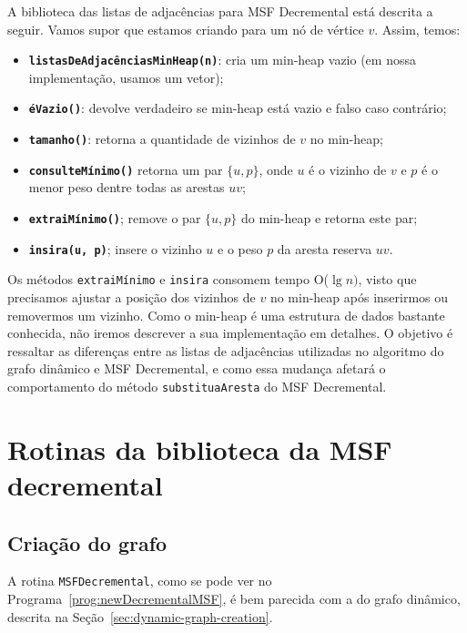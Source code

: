 A biblioteca das listas de adjacências para MSF Decremental está descrita a seguir. Vamos supor que estamos criando para um nó de vértice $v$. Assim, temos:

\begin{itemize}
    \item \texttt{\textbf{listasDeAdjacênciasMinHeap(n)}}: cria um min-heap vazio (em nossa implementação, usamos um vetor);
    \item \texttt{\textbf{éVazio()}}: devolve verdadeiro se min-heap está vazio e falso caso contrário;
    \item \texttt{\textbf{tamanho()}}: retorna a quantidade de vizinhos de $v$ no min-heap;
    \item \texttt{\textbf{consulteMínimo()}} retorna um par $\{u, p\}$, onde $u$ é o vizinho de $v$ e $p$ é o menor peso dentre todas as arestas $uv$;
    \item \texttt{\textbf{extraiMínimo()}}; remove o par $\{u, p\}$ do min-heap e retorna este par;
    \item \texttt{\textbf{insira(u, p)}}; insere o vizinho $u$ e o peso $p$ da aresta reserva $uv$.

\end{itemize} 

Os métodos \texttt{extraiMínimo} e \texttt{insira} consomem tempo O($\lg n)$, visto que precisamos ajustar a posição dos vizinhos de $v$ no min-heap após inserirmos ou removermos um vizinho. Como o min-heap é uma estrutura de dados bastante conhecida, não iremos descrever a sua implementação em detalhes. O objetivo é ressaltar as diferenças entre as listas de adjacências utilizadas no algoritmo do grafo dinâmico e MSF Decremental, e como essa mudança afetará o comportamento do método \texttt{substituaAresta} do MSF Decremental.

\section{Rotinas da biblioteca da MSF decremental}

\subsection{Criação do grafo}

A rotina \texttt{MSFDecremental}, como se pode ver no Programa~\ref{prog:newDecrementalMSF}, é bem parecida com a do grafo dinâmico, descrita na Seção~\ref{sec:dynamic-graph-creation}. 

